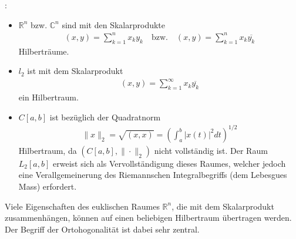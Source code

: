 \documentclass[letterpaper,10pt,english]{jupyterBook}
\begin{document}
:
\begin{itemize}
\item {} 
\(\mathbb{R}^n\) bzw. \(\mathbb{C}^n\) sind mit den Skalarprodukte
\begin{equation*}
\begin{split}(x,y) = \sum_{k=1}^n x_k y_k\quad\text{bzw.}\quad (x,y) = \sum_{k=1}^n x_k \overline{y_k}\end{split}
\end{equation*}
Hilberträume.

\item {} 
\(l_2\) ist mit dem Skalarprodukt
\begin{equation*}
\begin{split}(x,y) = \sum_{k=1}^\infty x_k \overline{y_k}\end{split}
\end{equation*}
ein Hilbertraum.

\item {} 
\(C[a,b]\) ist bezüglich der Quadratnorm
\begin{equation*}
\begin{split}\|x\|_2 = \sqrt{(x,x)} = \left(\int_a^b |x(t)|^2 dt\right)^{1/2}\end{split}
\end{equation*}
 Hilbertraum, da \((C[a,b], \|\cdot\|_2)\) nicht vollständig ist. Der Raum \(L_2[a,b]\) erweist sich als Vervollständigung dieses Raumes, welcher jedoch eine Verallgemeinerung des Riemannschen Integralbegriffs (dem Lebesgues Mass) erfordert.

\end{itemize}

Viele Eigenschaften des euklischen Raumes \(\mathbb{R}^n\), die mit dem Skalarprodukt zusammenhängen, können auf einen beliebigen Hilbertraum übertragen werden. Der Begriff der Ortohogonalität ist dabei sehr zentral.
\end{document}
